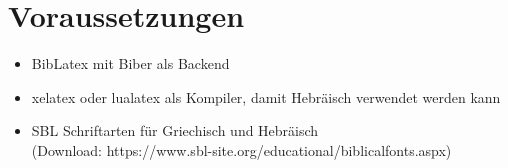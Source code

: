\section{Voraussetzungen}
\begin{itemize}
	\item BibLatex mit Biber als Backend
	\item xelatex oder lualatex als Kompiler, damit Hebräisch verwendet werden kann
	\item SBL Schriftarten für Griechisch und Hebräisch\\ (Download: https://www.sbl-site.org/educational/biblicalfonts.aspx)
\end{itemize}